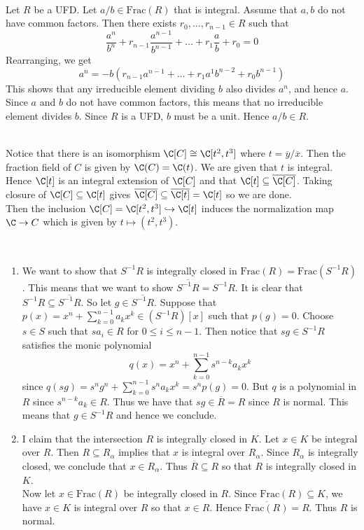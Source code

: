 \documentclass[a4paper]{article}
\begin{document}
\begin{ex}{}{}\\
Let $R$ be a UFD. Let $a/b\in\text{Frac}(R)$ that is integral. Assume that $a,b$ do not have common factors. Then there exists $r_0,\dots,r_{n-1}\in R$ such that $$\frac{a^n}{b^n}+r_{n-1}\frac{a^{n-1}}{b^{n-1}}+\dots+r_1\frac{a}{b}+r_0=0$$ Rearranging, we get $$a^n=-b\left(r_{n-1}a^{n-1}+\dots+r_1a^1b^{n-2}+r_0b^{n-1}\right)$$ This shows that any irreducible element dividing $b$ also divides $a^n$, and hence $a$. Since $a$ and $b$ do not have common factors, this means that no irreducible element divides $b$. Since $R$ is a UFD, $b$ must be a unit. Hence $a/b\in R$. 
\end{ex}

\begin{ex}{}{}\\
Notice that there is an isomorphism $\C[C]\cong\C[t^2,t^3]$ where $t=\overline{y}/\overline{x}$. Then the fraction field of $C$ is given by $\C(C)=\C(t)$. We are given that $t$ is integral. Hence $\C[t]$ is an integral extension of $\C[C]$ and that $\C[t]\subseteq\overline{\C[C]}$. Taking closure of $\C[C]\subseteq\C[t]$ gives $\overline{\C[C]}\subseteq\overline{\C[t]}=\C[t]$ so we are done. \\

Then the inclusion $\C[C]=\C[t^2,t^3]\hookrightarrow\C[t]$ induces the normalization map $\C\to C$ which is given by $t\mapsto(t^2,t^3)$. 
\end{ex}

\begin{ex}{}{}\\
\begin{enumerate}[label=(\alph*)]
\item We want to show that $S^{-1}R$ is integrally closed in $\text{Frac}(R)=\text{Frac}(S^{-1}R)$. This means that we want to show $\overline{S^{-1}R}=S^{-1}R$. It is clear that $S^{-1}R\subseteq\overline{S^{-1}R}$. So let $g\in\overline{S^{-1}R}$. Suppose that $p(x)=x^n+\sum_{k=0}^{n-1}a_kx^k\in (S^{-1}R)[x]$ such that $p(g)=0$. Choose $s\in S$ such that $sa_i\in R$ for $0\leq i\leq n-1$. Then notice that $sg\in S^{-1}R$ satisfies the monic polynomial $$q(x)=x^n+\sum_{k=0}^{n-1}s^{n-k}a_kx^k$$ since $q(sg)=s^ng^n+\sum_{k=0}^{n-1}s^na_kx^k=s^np(g)=0$. But $q$ is a polynomial in $R$ since $s^{n-k}a_k\in R$. Thus we have that $sg\in\overline{R}=R$ since $R$ is normal. This means that $g\in S^{-1}R$ and hence we conclude. 
\item I claim that the intersection $R$ is integrally closed in $K$. Let $x\in K$ be integral over $R$. Then $R\subseteq R_\alpha$ implies that $x$ is integral over $R_\alpha$. Since $R_\alpha$ is integrally closed, we conclude that $x\in R_\alpha$. Thus $\overline{R}\subseteq R$ so that $R$ is integrally closed in $K$. \\

Now let $x\in\text{Frac}(R)$ be integrally closed in $R$. Since $\text{Frac}(R)\subseteq K$, we have $x\in K$ is integral over $R$ so that $x\in R$. Hence $\overline{\text{Frac}(R)}=R$. Thus $R$ is normal. 
\end{enumerate}
\end{ex}
\end{document}
